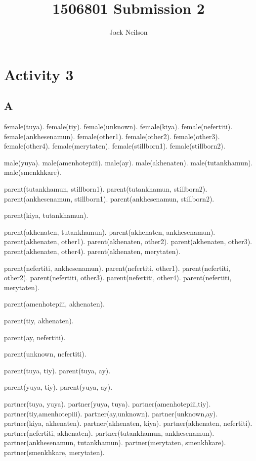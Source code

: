 \documentclass{article}
\begin{document}
\title{1506801 Submission 2}
\author{Jack Neilson}
\maketitle
\newpage
\section*{Activity 3}
\obeylines
\subsection*{A}

female(tuya).
female(tiy).
female(unknown).
female(kiya).
female(nefertiti).
female(ankhesenamun).
female(other1).
female(other2).
female(other3).
female(other4).
female(merytaten).
female(stillborn1).
female(stillborn2).

male(yuya).
male(amenhotepiii).
male(ay).
male(akhenaten).
male(tutankhamun).
male(smenkhkare).

parent(tutankhamun, stillborn1).
parent(tutankhamun, stillborn2).
parent(ankhesenamun, stillborn1).
parent(ankhesenamun, stillborn2).

parent(kiya, tutankhamun).

parent(akhenaten, tutankhamun).
parent(akhenaten, ankhesenamun).
parent(akhenaten, other1).
parent(akhenaten, other2).
parent(akhenaten, other3).
parent(akhenaten, other4).
parent(akhenaten, merytaten).

parent(nefertiti, ankhesenamun).
parent(nefertiti, other1).
parent(nefertiti, other2).
parent(nefertiti, other3).
parent(nefertiti, other4).
parent(nefertiti, merytaten).

parent(amenhotepiii, akhenaten).

parent(tiy, akhenaten).

parent(ay, nefertiti).

parent(unknown, nefertiti).

parent(tuya, tiy).
parent(tuya, ay).

parent(yuya, tiy).
parent(yuya, ay).


partner(tuya, yuya).
partner(yuya, tuya).
partner(amenhotepiii,tiy).
partner(tiy,amenhotepiii).
partner(ay,unknown).
partner(unknown,ay).
partner(kiya, akhenaten).
partner(akhenaten, kiya).
partner(akhenaten, nefertiti).
partner(nefertiti, akhenaten).
partner(tutankhamun, ankhesenamun).
partner(ankhesenamun, tutankhamun).
partner(merytaten, smenkhkare).
partner(smenkhkare, merytaten).

\newpage
\end{document}
